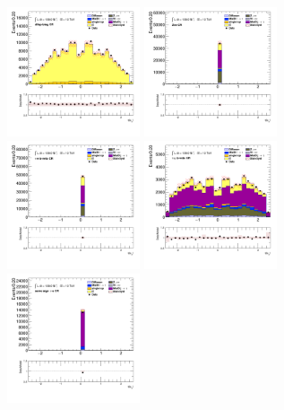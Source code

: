 		\begin{figure}[!htp]
			\begin{center}    
			\includegraphics[width=0.35\textwidth]{chapters/chapter6_HPlus/images/taulep/mu_0_eta_DILEP_BTAG.png}
			\includegraphics[width=0.35\textwidth]{chapters/chapter6_HPlus/images/taulep/mu_0_eta_ZEE.png} \\
			\includegraphics[width=0.35\textwidth]{chapters/chapter6_HPlus/images/taulep/mu_0_eta_TAUEL_BVETO.png} 
			\includegraphics[width=0.35\textwidth]{chapters/chapter6_HPlus/images/taulep/mu_0_eta_TAUMU_BVETO.png} \\
			\includegraphics[width=0.35\textwidth]{chapters/chapter6_HPlus/images/taulep/mu_0_eta_SS_TAUEL.png} 

\end{center}
\end{figure}

